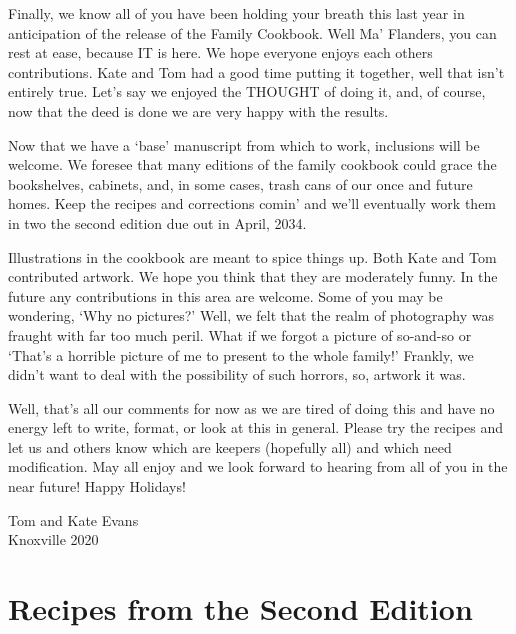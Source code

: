 \documentclass[12pt]{book}
\begin{document}
{\color{red}
Finally, we know all of you have been holding your breath this last year
in anticipation of the release of the Family Cookbook.  Well Ma'
Flanders, you can rest at ease, because IT is here.  We hope everyone
enjoys each others contributions.  Kate and Tom had a good time putting it
together, well that isn't entirely true.  Let's say we enjoyed the
THOUGHT of doing it, and, of course, now that the deed is done we are
very happy with the results.

Now that we have a `base' manuscript from which to work, inclusions will
be welcome.  We foresee that many editions of the family cookbook could
grace the bookshelves, cabinets, and, in some cases, trash cans of our
once and future homes.  Keep the recipes and corrections comin' and we'll
eventually work them in two the second edition due out in April, 2034.

Illustrations in the cookbook are meant to spice things up. Both Kate and
Tom contributed artwork.  We hope you think that they are moderately
funny.  In the future any contributions in this area are welcome.  Some
of you may be wondering, `Why no pictures?'  Well, we felt that the realm
of photography was fraught with far too much peril.  What if we forgot a
picture of so-and-so or `That's a horrible picture of me to present to
the whole family!'  Frankly, we didn't want to deal with the possibility
of such horrors, so, artwork it was.

Well, that's all our comments for now as we are tired of doing this and
have no energy left to write, format, or look at this in general.  Please
try the recipes and let us and others know which are keepers (hopefully
all) and which need modification.  May all enjoy and we look forward to
hearing from all of you  in the near future!  Happy Holidays!
}

\vspace{.5in}
\begin{flushright}
Tom and Kate Evans\\ Knoxville 2020
\end{flushright}


\mainmatter

\part{Recipes from the Second Edition}






\end{document}
